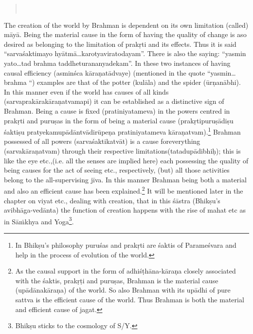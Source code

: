 \begin{verse}
\\
\end{verse}

The creation of the world by Brahman is dependent on its own limitation (called) māyā. Being the material cause in the form of having the quality of change is aso desired as belonging to the limitation of prakṛti and its effects. Thus it is said “sarvaśaktimayo hyātmā…karotyavirato\-dayam”. There is also the saying: “yasmin yato…tad brahma taddheturananyadekam”. In these two instances of having causal efficiency (asminśca kāraṇatādvaye) (mentioned in the quote “yasmin…brahma “) examples are that of the potter (kulāla) and the spider (ūrṇanābhi). In this manner even if the world has causes of all kinds (sarvaprakārakāra\-ṇatvamapi) it can be established as a distinctive sign of Brahman. Being a cause is fixed (pratiniyatameva) in the powers centred in prakṛti and puruṣas in the form of being a material cause (prakṛtipuruṣādiṣu śaktiṣu pratyekamupādāntvādirūpeṇa pratiniyatameva kāraṇatvam).\footnote{In Bhikṣu’s philosophy puruśas and prakṛti are śaktis of Parameśvara and help in the process of evolution of the world.} Brahman possessed of all powers (sarvaśaktikatvāt) is a cause for\break everything (sarvakāraṇatvam) through their respective limitations\break (tatadupādibhiḥ);  this is like the eye etc.,(i.e. all the senses are implied here) each possessing the quality of being causes for the act of seeing etc., respectively, (but) all those activities belong to the all-supervising jīva. In this manner Brahman being both a material and also an efficient cause has been explained.\footnote{As the causal support in the form of adhiśṭhāna-kāraṇa closely associated with the śaktis, prakṛṭi and puruṣas, Brahman is the material cause (upādānakāraṇa) of the world. So also Brahman with its upādhi of pure sattva is the efficient cause of the world. Thus Brahman is both the material and efficient cause of jagat.}  It will be mentioned later in the chapter on viyat etc., dealing with creation, that in this śāstra (Bhikṣu’s avibhāga-vedānta) the function of creation happens with the rise of mahat etc as in Sāṁkhya and Yoga\footnote{Bhikṣu sticks to the cosmology of S/Y.}. 

